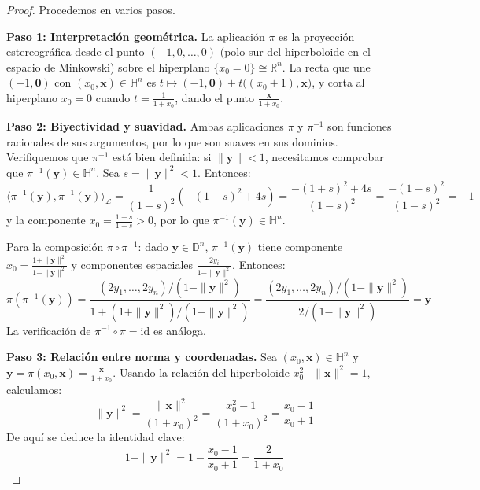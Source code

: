 \begin{proof}
Procedemos en varios pasos.

\textbf{Paso 1: Interpretación geométrica.}
La aplicación $\pi$ es la proyección estereográfica desde el punto $(-1, 0, \ldots, 0)$ (polo sur del hiperboloide en el espacio de Minkowski) sobre el hiperplano $\{x_0 = 0\} \cong \mathbb{R}^n$. La recta que une $(-1, \mathbf{0})$ con $(x_0, \mathbf{x}) \in \mathbb{H}^n$ es $t \mapsto (-1, \mathbf{0}) + t\bigl((x_0+1), \mathbf{x}\bigr)$, y corta al hiperplano $x_0 = 0$ cuando $t = \frac{1}{1+x_0}$, dando el punto $\frac{\mathbf{x}}{1+x_0}$.

\textbf{Paso 2: Biyectividad y suavidad.}
Ambas aplicaciones $\pi$ y $\pi^{-1}$ son funciones racionales de sus argumentos, por lo que son suaves en sus dominios. Verifiquemos que $\pi^{-1}$ está bien definida: si $\|\mathbf{y}\| < 1$, necesitamos comprobar que $\pi^{-1}(\mathbf{y}) \in \mathbb{H}^n$. Sea $s = \|\mathbf{y}\|^2 < 1$. Entonces:
\[
\langle \pi^{-1}(\mathbf{y}), \pi^{-1}(\mathbf{y}) \rangle_{\mathcal{L}} = \frac{1}{(1-s)^2}\left(-(1+s)^2 + 4s\right) = \frac{-(1+s)^2 + 4s}{(1-s)^2} = \frac{-(1-s)^2}{(1-s)^2} = -1
\]
y la componente $x_0 = \frac{1+s}{1-s} > 0$, por lo que $\pi^{-1}(\mathbf{y}) \in \mathbb{H}^n$.

Para la composición $\pi \circ \pi^{-1}$: dado $\mathbf{y} \in \mathbb{D}^n$, $\pi^{-1}(\mathbf{y})$ tiene componente $x_0 = \frac{1+\|\mathbf{y}\|^2}{1-\|\mathbf{y}\|^2}$ y componentes espaciales $\frac{2y_i}{1-\|\mathbf{y}\|^2}$. Entonces:
\[
\pi(\pi^{-1}(\mathbf{y})) = \frac{(2y_1, \ldots, 2y_n)/(1-\|\mathbf{y}\|^2)}{1 + (1+\|\mathbf{y}\|^2)/(1-\|\mathbf{y}\|^2)} = \frac{(2y_1, \ldots, 2y_n)/(1-\|\mathbf{y}\|^2)}{2/(1-\|\mathbf{y}\|^2)} = \mathbf{y}
\]
La verificación de $\pi^{-1} \circ \pi = \mathrm{id}$ es análoga.

\textbf{Paso 3: Relación entre norma y coordenadas.}
Sea $(x_0, \mathbf{x}) \in \mathbb{H}^n$ y $\mathbf{y} = \pi(x_0, \mathbf{x}) = \frac{\mathbf{x}}{1+x_0}$. Usando la relación del hiperboloide $x_0^2 - \|\mathbf{x}\|^2 = 1$, calculamos:
\begin{equation}\label{eq:norma_y_hiperboloide}
\|\mathbf{y}\|^2 = \frac{\|\mathbf{x}\|^2}{(1+x_0)^2} = \frac{x_0^2 - 1}{(1+x_0)^2} = \frac{x_0 - 1}{x_0 + 1}
\end{equation}
De aquí se deduce la identidad clave:
\begin{equation}\label{eq:factor_conforme_clave}
1 - \|\mathbf{y}\|^2 = 1 - \frac{x_0 - 1}{x_0 + 1} = \frac{2}{1 + x_0}
\end{equation}


\end{proof}
